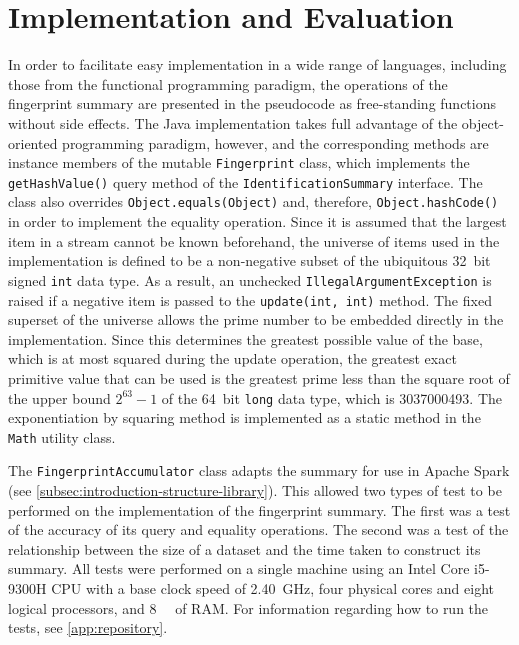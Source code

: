 \section{Implementation and Evaluation}
\label{sec:fingerprint-implementation}

In order to facilitate easy implementation in a wide range of languages, including those from the functional programming paradigm, the operations of the fingerprint summary are presented in the pseudocode as free-standing functions without side effects.
The Java implementation takes full advantage of the object-oriented programming paradigm, however, and the corresponding methods are instance members of the mutable \lstinline{Fingerprint} class, which implements the \lstinline{getHashValue()} query method of the \lstinline{IdentificationSummary} interface.
The class also overrides \lstinline{Object.equals(Object)} and, therefore, \lstinline{Object.hashCode()} in order to implement the equality operation.
Since it is assumed that the largest item in a stream cannot be known beforehand, the universe of items used in the implementation is defined to be a non-negative subset of the ubiquitous \num{32}~bit signed \lstinline{int} data type.
As a result, an unchecked \lstinline{IllegalArgumentException} is raised if a negative item is passed to the \lstinline{update(int, int)} method.
The fixed superset of the universe allows the prime number to be embedded directly in the implementation.
Since this determines the greatest possible value of the base, which is at most squared during the update operation, the greatest exact primitive value that can be used is the greatest prime less than the square root of the upper bound \( 2^{63} - 1 \) of the \num{64}~bit \lstinline{long} data type, which is \num{3037000493}.
The exponentiation by squaring method is implemented as a static method in the \lstinline{Math} utility class.

The \lstinline{FingerprintAccumulator} class adapts the summary for use in Apache Spark (see \cref{subsec:introduction-structure-library}).
This allowed two types of test to be performed on the implementation of the fingerprint summary.
The first was a test of the accuracy of its query and equality operations.
The second was a test of the relationship between the size of a dataset and the time taken to construct its summary.
All tests were performed on a single machine using an Intel Core i5-9300H CPU with a base clock speed of \SI{2.40}{\giga\hertz}, four physical cores and eight logical processors, and \SI{8}{\gibi\byte} of RAM\@.
For information regarding how to run the tests, see \cref{app:repository}.

